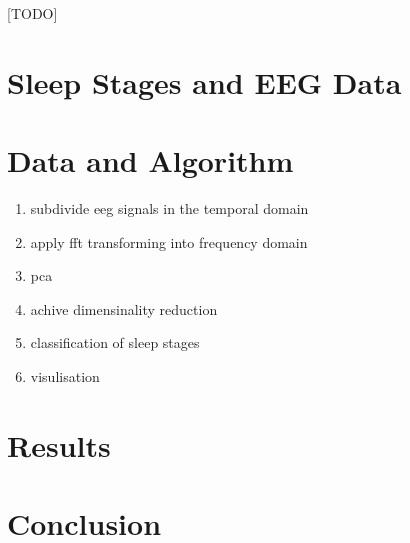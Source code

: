 \documentclass[a4paper]{IEEEtran}
\begin{document}
[TODO]


\section{Sleep Stages and EEG Data}
\label{sec:sleep_stages_and_eeg_data}

\section{Data and Algorithm}
\label{sec:data_and_algorithm}

\begin{enumerate}
	\item subdivide eeg signals in the temporal domain
	\item apply fft transforming into frequency domain
	\item pca
	\item achive dimensinality reduction
	\item classification of sleep stages
	\item visulisation
\end{enumerate}

\section{Results}
\label{sec:results}

\section{Conclusion}
\label{sec:conclusion}



\end{document}
